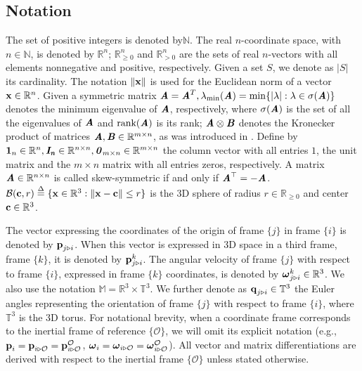 \subsection{Notation}

The set of positive integers is denoted by$\mathbb{N}$. The real $n$-coordinate
space, with $n\in\mathbb{N}$, is denoted by $\mathbb{R}^n$;
$\mathbb{R}^n_{\geq 0}$ and $\mathbb{R}^n_{> 0}$ are the sets of real
$n$-vectors with all elements nonnegative and positive, respectively. Given a
set $S$, we denote as $\lvert S\lvert$ its cardinality. The notation
$\|\bm{\mathbf{x}}\|$ is used for the Euclidean norm of a vector
$\bm{\mathbf{x}} \in \mathbb{R}^n$. Given a symmetric matrix
$\bm{\mathit{A}} = \bm{\mathit{A}}^T, \lambda_{\text{min}}(\bm{\mathit{A}}) = \min \{|\lambda| : \lambda \in \sigma(\bm{\mathit{A}}) \}$
denotes the minimum eigenvalue of $\bm{\mathit{A}}$, respectively, where
$\sigma(\bm{\mathit{A}})$ is the set of all the eigenvalues of
$\bm{\mathit{A}}$ and $\text{rank}(\bm{\mathit{A}})$ is its rank;
$\bm{\mathit{A}} \otimes \bm{\mathit{B}}$ denotes the Kronecker product of matrices
$\bm{\mathit{A}}, \bm{\mathit{B}} \in \mathbb{R}^{m \times n}$,
as was introduced in \cite{horn_jonshon}.
Define by
$\bm{\mathbf{1}}_n \in \mathbb{R}^n, \bm{\mathit{I_n}} \in \mathbb{R}^{n \times n},
\bm{\mathit{0}}_{m \times n} \in \mathbb{R}^{m \times n}$
the column vector with all entries $1$, the unit matrix and the $m \times n$
matrix with all entries zeros, respectively.
A matrix $\bm{\mathit{A}} \in \mathbb{R}^{n \times n}$ is called skew-symmetric if and only
if $\bm{\mathit{A}}^\top = -\bm{\mathit{A}}$.
$\mathcal{B}(\bm{\mathbf{c}},r) \overset{\Delta}{=} \{\bm{\mathbf{x}} \in \mathbb{R}^3: \|\bm{\mathbf{x}}-\bm{\mathbf{c}}\| \leq r\}$
is the $3$D sphere of radius $r \in \mathbb{R}_{\ge 0}$ and center
$\bm{\mathbf{c}}\in\mathbb{R}^{3}$.

The vector expressing the coordinates of the origin of frame $\{j\}$ in
frame $\{i\}$ is denoted by $\bm{\mathbf{p}}_{j \triangleright i}$. When this vector is
expressed in 3D space in a third frame, frame $\{k\}$, it is denoted by
$\bm{\mathbf{p}}_{j \triangleright i}^{k}$.
The angular velocity of frame $\{j\}$ with respect to frame $\{i\}$, expressed
in frame $\{k\}$ coordinates, is denoted by
$\bm{\mathbf{\omega}}^k_{j \triangleright i}\in \mathbb{R}^{3}$.
We also use the notation $\mathbb{M} = \mathbb{R}^3\times \mathbb{T}^3$.
We further denote as $\bm{\mathbf{q}}_{j \triangleright i} \in \mathbb{T}^3$
the Euler angles representing the orientation of frame $\{j\}$ with respect to
frame $\{i\}$, where $\mathbb{T}^3$ is the $3$D torus.
For notational brevity, when a coordinate frame corresponds to the inertial frame
of reference $\{\mathcal{O}\}$, we will omit its explicit notation
(e.g., $\bm{\mathbf{p}}_i = \bm{\mathbf{p}}_{i \triangleright \mathcal{O}} = \bm{\mathbf{p}}^\mathcal{O}_{i \triangleright \mathcal{O}}$,
$\bm{\mathbf{\omega}}_i = \bm{\mathbf{\omega}}_{i \triangleright \mathcal{O}} = \bm{\mathbf{\omega}}^\mathcal{O}_{i \triangleright \mathcal{O}}$).
All vector and matrix differentiations are derived with respect to the inertial
frame $\{\mathcal{O}\}$ unless stated otherwise.
